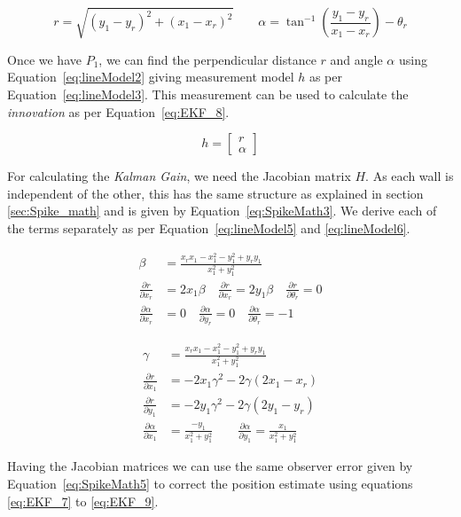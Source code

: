 \begin{equation}
	\label{eq:lineModel2}
	r=\sqrt{(y_1-y_r)^2+(x_1-x_r)^2}
	\qquad
	\alpha = \tan^{-1}\left(\frac{y_1-y_r}{x_1-x_r}\right)-\theta_r
\end{equation}

Once we have $ P_1 $, we can find the perpendicular distance $ r $ and angle $ \alpha $ using Equation~\ref{eq:lineModel2} giving measurement model $ h $ as per Equation~\ref{eq:lineModel3}. This measurement can be used to calculate the \textit{innovation} as per Equation~\ref{eq:EKF_8}. 

\begin{equation}
	\label{eq:lineModel3}
	h=\begin{bmatrix}
	r\\\alpha
	\end{bmatrix}
\end{equation}

For calculating the \textit{Kalman Gain}, we need the Jacobian matrix $ H $. As each wall is independent of the other, this has the same structure as explained in section \ref{sec:Spike_math} and is given by Equation~\ref{eq:SpikeMath3}. We derive each of the terms separately as per Equation~\ref{eq:lineModel5} and \ref{eq:lineModel6}.  

\begin{subequations}
\label{eq:lineModel5}
	\begin{align}
	\beta &= \frac{x_rx_1-x_1^2-y_1^2+y_ry_1}{x_1^2+y_1^2}\\
	\frac{\partial r}{\partial x_r} &= 2x_1\beta \quad
	\frac{\partial r}{\partial x_r} = 2y_1\beta \quad
	\frac{\partial r}{\partial \theta_r} = 0 \\
	\frac{\partial \alpha}{\partial x_r} &= 0 \quad 
	\frac{\partial \alpha}{\partial y_r} = 0 \quad 
	\frac{\partial \alpha}{\partial \theta_r} = -1
	\end{align}
\end{subequations}

\begin{subequations}
\label{eq:lineModel6}
	\begin{align}	
	\gamma &= \frac{x_rx_1-x_1^2-y_1^2+y_ry_1}{x_1^2+y_1^2} \\
	\frac{\partial r}{\partial x_1} &= 
	-2x_1\gamma^2 - 2\gamma(2x_1-x_r) \\
	\frac{\partial r}{\partial y_1} &= 
	-2y_1\gamma^2 - 2\gamma(2y_1-y_r)	\\
	\frac{\partial \alpha}{\partial x_1} &=  \frac{-y_1}{x_1^2+y_1^2}\qquad
	\frac{\partial \alpha}{\partial y_1} =
	\frac{x_1}{x_1^2+y_1^2} 
	\end{align}
\end{subequations}

Having the Jacobian matrices we can use the same observer error given by Equation~\ref{eq:SpikeMath5} to correct the position estimate using equations \ref{eq:EKF_7} to \ref{eq:EKF_9}.